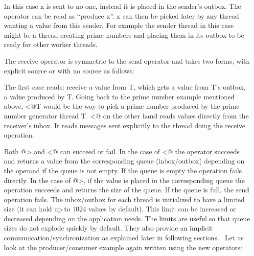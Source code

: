 In this case \textsf{x} is sent to no one, instead it is
placed in the sender{\textquoteright}s outbox. The operator can be read
as {\textquotedblleft}produce
\textsf{x{\textquotedblright}}. \textsf{x} can
then be picked later by any thread wanting a value from this sender.
For example the sender thread in this case might be a thread creating
prime numbers and placing them in its outbox to be ready for other
worker threads.

The receive operator is symmetric to the send operator and takes two
forms, with explicit source or with no source as follows:


The first case reads: receive a value from T, which gets a value from
\textsf{T}{\textquoteright}s outbox, a value produced by
\textsf{T}. Going back to the prime number example mentioned
above, \textsf{{\textless}@T} would be the way to pick a
prime number produced by the prime number generator thread
\textsf{T}. \textsf{{\textless}@} on the other
hand reads values directly from the receiver{\textquoteright}s inbox.
It reads messages sent explicitly to the thread doing the receive
operation.

Both \textsf{@{\textgreater}} and
\textsf{{\textless}@ }can succeed or fail. In the case
of \textsf{{\textless}@} the operator succeeds and
returns a value from the corresponding queue (inbox/outbox) depending
on the operand if the queue is not empty. If the queue is empty the
operation fails directly. In the case of
\textsf{@{\textgreater}}, if the value is placed in the
corresponding queue the operation succeeds and returns the size of the
queue. If the queue is full, the send operation fails. The inbox/outbox
for each thread is initialized to have a limited size (it can hold up
to 1024 values by default). This limit can be increased or decreased
depending on the application needs. The limits are useful so that queue
sizes do not explode quickly by default. They also provide an implicit
communication/synchronization as explained later in following sections.
\ Let us look at the producer/consumer example again written using the
new operators:


